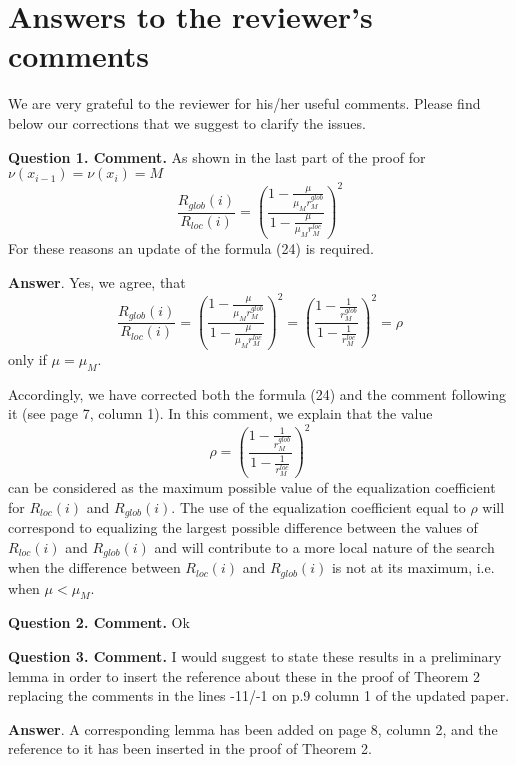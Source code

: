 \documentclass[12pt]{article}%
\begin{document}
\section*{Answers to the reviewer's comments}

We are very grateful to the reviewer for his/her useful comments. Please find below our corrections that we suggest to clarify the issues.

\phantom{f}

\textbf{Question 1. Comment.} As shown in the last part of the proof for $\nu(x_{i-1}) = \nu(x_i) = M$
\[
\frac{R_{glob}(i)}{R_{loc}(i)}=\left( \frac{1-\frac{\mu}{\mu_M r_M^{glob}}}{1-\frac{\mu}{\mu_M r_M^{loc}}} \right)^2
\]
For these reasons an update of the formula (24) is required.

\textbf{Answer}. Yes, we agree, that 
\[
\frac{R_{glob}(i)}{R_{loc}(i)}=\left( \frac{1-\frac{\mu}{\mu_M r_M^{glob}}}{1-\frac{\mu}{\mu_M r_M^{loc}}} \right)^2 = \left( \frac{1-\frac{1}{r_M^{glob}}}{1-\frac{1}{r_M^{loc}}} \right)^2 = \rho
\]
only if $\mu = \mu_M$.

Accordingly, we have corrected both the formula (24) and the comment following it (see page 7, column 1).
In this comment, we explain that the value 
\[
\rho = \left( \frac{1-\frac{1}{r_M^{glob}}}{1-\frac{1}{r_M^{loc}}} \right)^2
\] 
can be considered as the maximum possible value of the equalization coefficient for $R_{loc}(i)$ and $R_{glob}(i)$.
The use of the equalization coefficient equal to $\rho$ will correspond to equalizing the largest possible difference between the values of $R_{loc}(i)$ and $R_{glob}(i)$ and will contribute to a more local nature of the search when the difference between $R_{loc}(i)$ and $R_{glob}(i)$ is not at its maximum, i.e. when $\mu < \mu_M$.


\phantom{f}

\phantom{f}

\textbf{Question 2. Comment.} Ok

\break

\textbf{Question 3. Comment.} I would suggest to state these results in a preliminary lemma in order
to insert the reference about these in the proof of Theorem 2 replacing the
comments in the lines -11/-1 on p.9 column 1 of the updated paper.

\textbf{Answer}. A corresponding lemma has been added on page 8, column 2, and the reference to it has been inserted in the proof of Theorem 2.
\end{document}
